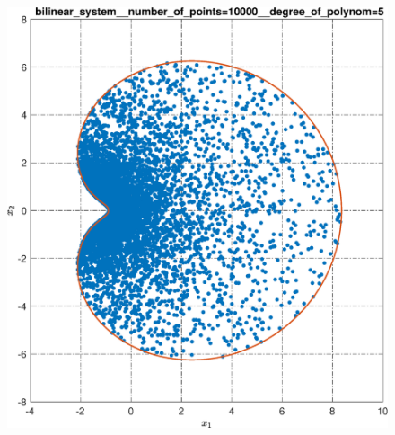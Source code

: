 \documentclass[../main.tex]{subfiles}
\begin{document}
\begin{figure}[ht!]
\begin{minipage}[b]{.3\linewidth}
  	\end{minipage} 
  	\hfill
  	\begin{minipage}[b]{.3\linewidth} 
  		\small
  		\centering 
  		\includegraphics[width=\linewidth]{images/bilinear_system__number_of_points=10000__degree_of_polynom=5.eps}
  	\end{minipage}
	 \vfill
	\hspace{-2.5ex}
  	\begin{minipage}[b]{.3\linewidth} 
  		\small
  		\centering

\end{minipage}
\end{figure}
\end{document}
